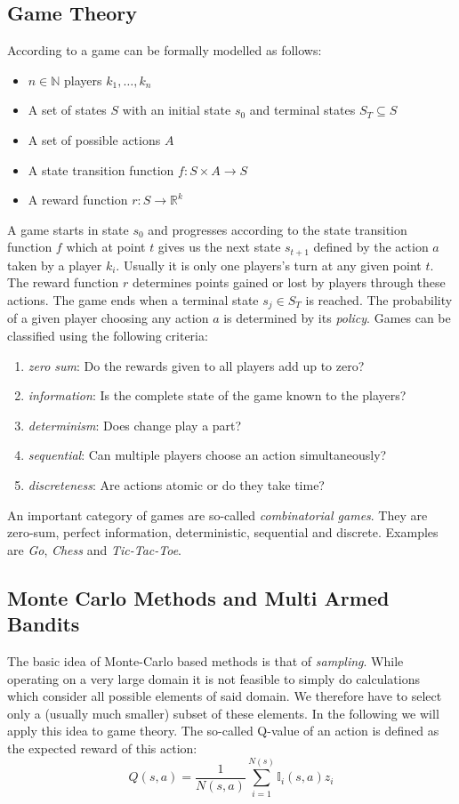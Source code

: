 \subsection{Game Theory}
\label{ss:game_theory}
According to \cite{browne2012survey} a game can be formally modelled as follows:
\begin{itemize}[noitemsep]
    \item $n \in \mathbb{N}$ players $k_1, \ldots, k_n$
    \item A set of states $S$ with an initial state $s_0$ and terminal states $S_T \subseteq S$
    \item A set of possible actions $A$
    \item A state transition function $f: S \times A \to S$
    \item A reward function $r: S \to \mathbb{R}^k$
\end{itemize}
A game starts in state $s_0$ and progresses according to the state transition function $f$ which at point $t$ gives us the next state $s_{t+1}$ defined by the action $a$ taken by a player $k_i$. Usually it is only one players's turn at any given point $t$. The reward function $r$ determines points gained or lost by players through these actions. The game ends when a terminal state $s_j \in S_T$ is reached. The probability of a given player choosing any action $a$ is determined by its \textit{policy}. Games can be classified using the following criteria:
\begin{enumerate}[label=\alph*)]
    \item \textit{zero sum}: Do the rewards given to all players add up to zero?
    \item \textit{information}: Is the complete state of the game known to the players?
    \item \textit{determinism}: Does change play a part?
    \item \textit{sequential}: Can multiple players choose an action simultaneously?
    \item \textit{discreteness}: Are actions atomic or do they take time? 
\end{enumerate}
An important category of games are so-called \textit{combinatorial games}. They are zero-sum, perfect information, deterministic, sequential and discrete. Examples are \textit{Go}, \textit{Chess} and \textit{Tic-Tac-Toe}. 
\subsection{Monte Carlo Methods and Multi Armed Bandits}
The basic idea of Monte-Carlo based methods is that of \textit{sampling}. While operating on a very large domain it is not feasible to simply do calculations which consider all possible elements of said domain. We therefore have to select only a (usually much smaller) subset of these elements. In the following we will apply this idea to game theory. 
The so-called Q-value of an action is defined as the expected reward of this action:
\begin{equation}
    Q(s,a)= \frac{1}{N(s,a)} \sum_{i=1}^{N(s)} \mathbb{I}_i(s,a)z_i
\end{equation}

